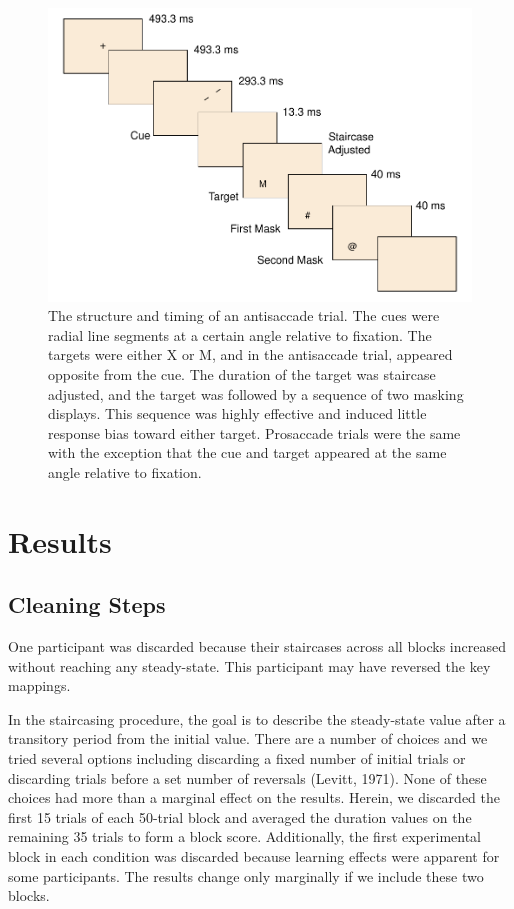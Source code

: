 \documentclass[
  ,man,floatsintext]{apa6}
\begin{document}
\begin{figure}
\centering
\includegraphics{p_files/figure-latex/trial-1.pdf}
\caption{\label{fig:trial}The structure and timing of an antisaccade trial. The cues were radial line segments at a certain angle relative to fixation. The targets were either X or M, and in the antisaccade trial, appeared opposite from the cue. The duration of the target was staircase adjusted, and the target was followed by a sequence of two masking displays. This sequence was highly effective and induced little response bias toward either target. Prosaccade trials were the same with the exception that the cue and target appeared at the same angle relative to fixation.}
\end{figure}

\hypertarget{results}{%
\section{Results}\label{results}}

\hypertarget{cleaning-steps}{%
\subsection{Cleaning Steps}\label{cleaning-steps}}

One participant was discarded because their staircases across all blocks increased without reaching any steady-state. This participant may have reversed the key mappings.

In the staircasing procedure, the goal is to describe the steady-state value after a transitory period from the initial value. There are a number of choices and we tried several options including discarding a fixed number of initial trials or discarding trials before a set number of reversals (Levitt, 1971). None of these choices had more than a marginal effect on the results. Herein, we discarded the first 15 trials of each 50-trial block and averaged the duration values on the remaining 35 trials to form a block score. Additionally, the first experimental block in each condition was discarded because learning effects were apparent for some participants. The results change only marginally if we include these two blocks.
\end{document}

